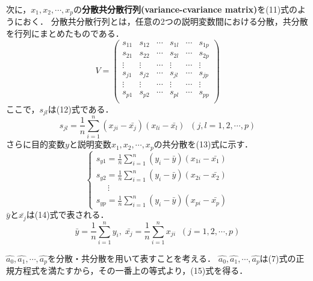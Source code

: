 \documentclass[dvipdfmx]{jsarticle}
\begin{document}
次に，$x_1, x_2, \cdots, x_p$の\textbf{分散共分散行列(variance-cvariance matrix)}を(11)式のようにおく．
分散共分散行列とは，任意の2つの説明変数間における分散，共分散を行列にまとめたものである．
\begin{equation}
  V =
  \begin{pmatrix}
    s_{11} & s_{12} & \cdots & s_{1l} & \cdots & s_{1p} \\
    s_{21} & s_{22} & \cdots & s_{2l} & \cdots & s_{2p} \\
    \vdots & \vdots & \cdots & \vdots & \cdots & \vdots \\
    s_{j1} & s_{j2} & \cdots & s_{jl} & \cdots & s_{jp} \\
    \vdots & \vdots & \cdots & \vdots & \cdots & \vdots \\
    s_{p1} & s_{p2} & \cdots & s_{pl} & \cdots & s_{pp} \\
  \end{pmatrix}
\end{equation}
ここで，$s_{jl}$は(12)式である．
\begin{equation}
  s_{jl}=\frac{1}{n}\sum_{i=1}^n (x_{ji}-\bar{x_j})(x_{li}-\bar{x_l}) \; \; (j,l=1, 2, \cdots, p)
\end{equation}
さらに目的変数$y$と説明変数$x_1,x_2,\cdots ,x_p$の共分散を(13)式に示す．
\begin{equation}
  \begin{cases}
    \displaystyle
    s_{y1} = \frac{1}{n}\sum_{i=1}^n (y_{i}-\bar{y})(x_{1i}-\bar{x_1}) \\
    \displaystyle
    s_{y2} = \frac{1}{n}\sum_{i=1}^n (y_{i}-\bar{y})(x_{2i}-\bar{x_2}) \\
    \; \; \; \; \; \vdots                                              \\
    \displaystyle
    s_{yp} = \frac{1}{n}\sum_{i=1}^n (y_{i}-\bar{y})(x_{pi}-\bar{x_p})
  \end{cases}
\end{equation}
$\bar{y}$と$\bar{x_j}$は(14)式で表される．
\begin{equation}
  \bar{y}=\frac{1}{n}\sum_{i=1}^n y_i , \;\bar{x_j}=\frac{1}{n} \sum_{i=1}^{n} x_{ji} \; \; (j=1, 2, \cdots, p)
\end{equation}

$\hat{a_0},\hat{a_1}, \cdots, \hat{a_p}$を分散・共分散を用いて表すことを考える．
$\hat{a_0},\hat{a_1}, \cdots, \hat{a_p}$は(7)式の正規方程式を満たすから，その一番上の等式より，(15)式を得る．
\end{document}
